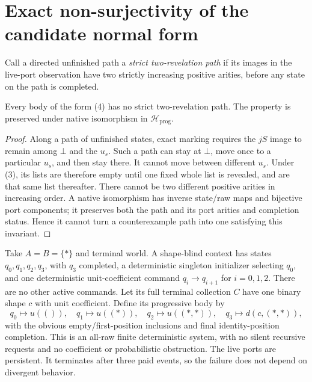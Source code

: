 \documentclass[11pt]{article}\usepackage{amsmath,amssymb,amsthm,geometry}\geometry{margin=1in}
\begin{document}
\section{Exact non-surjectivity of the candidate normal form}
Call a directed unfinished path a \emph{strict two-revelation path} if its images in the live-port observation have two strictly increasing positive arities, before any state on the path is completed.

\begin{lemma}
Every body of the form (4) has no strict two-revelation path. The property is preserved under native isomorphism in $\mathcal H_{\mathrm{prog}}$.
\end{lemma}
\begin{proof}
Along a path of unfinished states, exact marking requires the $jS$ image to remain among $\bot$ and the $u_s$. Such a path can stay at $\bot$, move once to a particular $u_s$, and then stay there. It cannot move between different $u_s$. Under (3), its lists are therefore empty until one fixed whole list is revealed, and are that same list thereafter. There cannot be two different positive arities in increasing order. A native isomorphism has inverse state/raw maps and bijective port components; it preserves both the path and its port arities and completion status. Hence it cannot turn a counterexample path into one satisfying this invariant.\end{proof}

Take $A=B=\{*\}$ and terminal world. A shape-blind context has states $q_0,q_1,q_2,q_3$, with $q_3$ completed, a deterministic singleton initializer selecting $q_0$, and one deterministic unit-coefficient command $q_i\to q_{i+1}$ for $i=0,1,2$. There are no other active commands. Let its full terminal collection $C$ have one binary shape $c$ with unit coefficient. Define its progressive body by
\[
 q_0\mapsto u(()),\quad q_1\mapsto u((*)),\quad
 q_2\mapsto u((*,*)),\quad q_3\mapsto d(c,(*,*)),             \tag{5}
\]
with the obvious empty/first-position inclusions and final identity-position completion. This is an all-raw finite deterministic system, with no silent recursive requests and no coefficient or probabilistic obstruction. The live ports are persistent. It terminates after three paid events, so the failure does not depend on divergent behavior.
\end{document}
